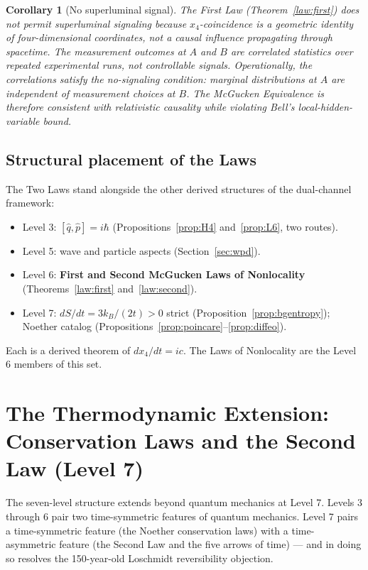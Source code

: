 \documentclass[11pt,a4paper]{article}
\newtheorem{corollary}{Corollary}
\begin{document}
\begin{corollary}[No superluminal signal]
\label{cor:nosignal}
The First Law (Theorem~\ref{law:first}) does not permit superluminal signaling because $x_4$-coincidence is a geometric identity of four-dimensional coordinates, not a causal influence propagating through spacetime. The measurement outcomes at $A$ and $B$ are correlated statistics over repeated experimental runs, not controllable signals. Operationally, the correlations satisfy the no-signaling condition: marginal distributions at $A$ are independent of measurement choices at $B$. The McGucken Equivalence is therefore consistent with relativistic causality while violating Bell's local-hidden-variable bound.
\end{corollary}

\subsection{Structural placement of the Laws}

The Two Laws stand alongside the other derived structures of the dual-channel framework:

\begin{itemize}
\item Level 3: $[\hat{q}, \hat{p}] = i\hbar$ (Propositions~\ref{prop:H4} and~\ref{prop:L6}, two routes).
\item Level 5: wave and particle aspects (Section~\ref{sec:wpd}).
\item Level 6: \textbf{First and Second McGucken Laws of Nonlocality} (Theorems~\ref{law:first} and~\ref{law:second}).
\item Level 7: $dS/dt = 3k_B/(2t) > 0$ strict (Proposition~\ref{prop:bgentropy}); Noether catalog (Propositions~\ref{prop:poincare}--\ref{prop:diffeo}).
\end{itemize}

Each is a derived theorem of $dx_4/dt = ic$. The Laws of Nonlocality are the Level 6 members of this set.

\section{The Thermodynamic Extension: Conservation Laws and the Second Law (Level 7)}
\label{sec:thermo}

The seven-level structure extends beyond quantum mechanics at Level 7. Levels 3 through 6 pair two time-symmetric features of quantum mechanics. Level 7 pairs a time-symmetric feature (the Noether conservation laws) with a time-asymmetric feature (the Second Law and the five arrows of time) --- and in doing so resolves the 150-year-old Loschmidt reversibility objection.
\end{document}
